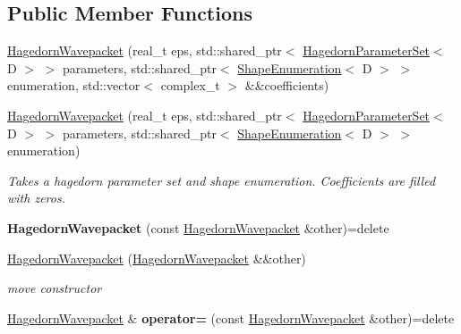 \subsection*{Public Member Functions}
\begin{DoxyCompactItemize}
\item 
\hyperlink{classwaveblocks_1_1_hagedorn_wavepacket_ab69d08d3db692dcd5fc347edcb0d27f6}{Hagedorn\+Wavepacket} (real\+\_\+t eps, std\+::shared\+\_\+ptr$<$ \hyperlink{structwaveblocks_1_1_hagedorn_parameter_set}{Hagedorn\+Parameter\+Set}$<$ D $>$ $>$ parameters, std\+::shared\+\_\+ptr$<$ \hyperlink{classwaveblocks_1_1_shape_enumeration}{Shape\+Enumeration}$<$ D $>$ $>$ enumeration, std\+::vector$<$ complex\+\_\+t $>$ \&\&coefficients)
\item 
\hyperlink{classwaveblocks_1_1_hagedorn_wavepacket_a098e87526ad724933ebcaab127b14348}{Hagedorn\+Wavepacket} (real\+\_\+t eps, std\+::shared\+\_\+ptr$<$ \hyperlink{structwaveblocks_1_1_hagedorn_parameter_set}{Hagedorn\+Parameter\+Set}$<$ D $>$ $>$ parameters, std\+::shared\+\_\+ptr$<$ \hyperlink{classwaveblocks_1_1_shape_enumeration}{Shape\+Enumeration}$<$ D $>$ $>$ enumeration)
\begin{DoxyCompactList}\small\item\em Takes a hagedorn parameter set and shape enumeration. Coefficients are filled with zeros. \end{DoxyCompactList}\item 
\hypertarget{classwaveblocks_1_1_hagedorn_wavepacket_ab6d0fe29627b88e1eb9545185f95ca07}{}{\bfseries Hagedorn\+Wavepacket} (const \hyperlink{classwaveblocks_1_1_hagedorn_wavepacket}{Hagedorn\+Wavepacket} \&other)=delete\label{classwaveblocks_1_1_hagedorn_wavepacket_ab6d0fe29627b88e1eb9545185f95ca07}

\item 
\hypertarget{classwaveblocks_1_1_hagedorn_wavepacket_aeb68bad722260c34b3a8c24f19025d36}{}\hyperlink{classwaveblocks_1_1_hagedorn_wavepacket_aeb68bad722260c34b3a8c24f19025d36}{Hagedorn\+Wavepacket} (\hyperlink{classwaveblocks_1_1_hagedorn_wavepacket}{Hagedorn\+Wavepacket} \&\&other)\label{classwaveblocks_1_1_hagedorn_wavepacket_aeb68bad722260c34b3a8c24f19025d36}

\begin{DoxyCompactList}\small\item\em move constructor \end{DoxyCompactList}\item 
\hypertarget{classwaveblocks_1_1_hagedorn_wavepacket_a9959c105e90542b59c68f609c7963092}{}\hyperlink{classwaveblocks_1_1_hagedorn_wavepacket}{Hagedorn\+Wavepacket} \& {\bfseries operator=} (const \hyperlink{classwaveblocks_1_1_hagedorn_wavepacket}{Hagedorn\+Wavepacket} \&other)=delete\label{classwaveblocks_1_1_hagedorn_wavepacket_a9959c105e90542b59c68f609c7963092}


\end{DoxyCompactItemize}
